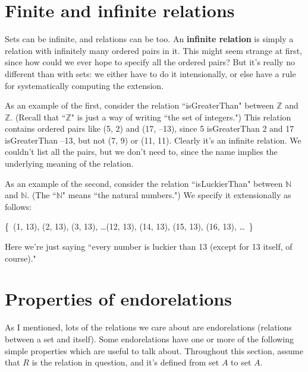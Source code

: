 \section{Finite and infinite relations}

Sets can be infinite, and relations can be too. An \textbf{infinite
relation} is simply a relation with infinitely many ordered pairs in it.
This might seem strange at first, since how could we ever hope to specify
all the ordered pairs? But it's really no different than with sets: we
either have to do it intensionally, or else have a rule for systematically
computing the extension.

As an example of the first, consider the relation ``isGreaterThan" between
$\mathbb{Z}$ and $\mathbb{Z}$. (Recall that ``$\mathbb{Z}$" is just a way
of writing ``the set of integers.") This relation contains ordered pairs
like (5, 2) and (17, --13), since 5 isGreaterThan 2 and 17 isGreaterThan
--13, but not (7, 9) or (11, 11). Clearly it's an infinite relation. We
couldn't list all the pairs, but we don't need to, since the name implies
the underlying meaning of the relation.

As an example of the second, consider the relation ``isLuckierThan" between
$\mathbb{N}$ and $\mathbb{N}$. (The ``$\mathbb{N}$" means ``the natural
numbers.") We specify it extensionally as follows:

\begin{center}
\{~(1, 13), (2, 13), (3, 13), \dots (12, 13), (14, 13), (15, 13),
(16, 13), \dots~\}
\end{center}

Here we're just saying ``every number is luckier than 13 (except for 13
itself, of course)."


\section{Properties of endorelations}

As I mentioned, lots of the relations we care about are endorelations
(relations between a set and itself). Some endorelations have one or more
of the following simple properties which are useful to talk about.
Throughout this section, assume that $R$ is the relation in question, and
it's defined from set $A$ to set $A$.

